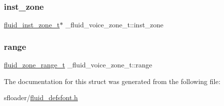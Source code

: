 \subsubsection{\texorpdfstring{inst\+\_\+zone}{inst\_zone}}
{\footnotesize\ttfamily \hyperlink{fluid__defsfont_8h_aa02ac18b4c58545cc3b297bdf4d933ab}{fluid\+\_\+inst\+\_\+zone\+\_\+t}$\ast$ \+\_\+fluid\+\_\+voice\+\_\+zone\+\_\+t\+::inst\+\_\+zone}

\mbox{\label{struct__fluid__voice__zone__t_aa4ab9b1dcdb5c972cb37458478ec2fe6}} 
\subsubsection{\texorpdfstring{range}{range}}
{\footnotesize\ttfamily \hyperlink{fluidsynth__priv_8h_ac8502f0049ba8c20821b136e611462da}{fluid\+\_\+zone\+\_\+range\+\_\+t} \+\_\+fluid\+\_\+voice\+\_\+zone\+\_\+t\+::range}



The documentation for this struct was generated from the following file\+:\begin{DoxyCompactItemize}
\item 
sfloader/\hyperlink{fluid__defsfont_8h}{fluid\+\_\+defsfont.\+h}\end{DoxyCompactItemize}
